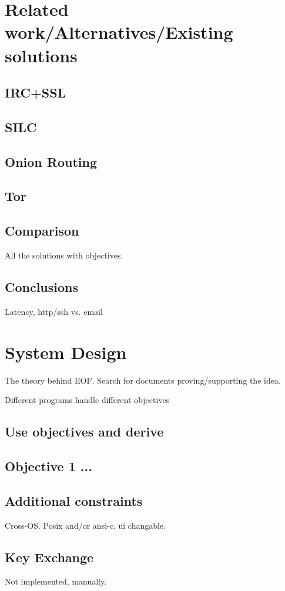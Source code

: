 \documentclass[12pt,a4paper]{article}
\begin{document}
\section{Related work/Alternatives/Existing solutions}
\subsection{IRC+SSL}
\subsection{SILC}
\subsection{Onion Routing}
\subsection{Tor}
\subsection{Comparison}
All the solutions with objectives.
\subsection{Conclusions}
Latency, http/ssh vs. email

\section{System Design}
The theory behind EOF.
Search for documents proving/supporting the idea.

Different programs handle different objectives
\subsection{Use objectives and derive}
\subsection{Objective 1 ...}
\subsection{Additional constraints}
Cross-OS. Posix and/or ansi-c. ui changable.
\subsection{Key Exchange}
Not implemented, manually.
\end{document}
